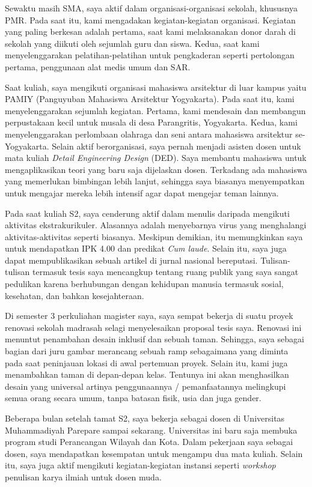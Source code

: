 \documentclass[../main.tex]{subfiles}
\begin{document}
Sewaktu masih SMA, saya aktif dalam organisasi-organisasi sekolah, khususnya PMR. Pada saat itu, kami mengadakan kegiatan-kegiatan organisasi. Kegiatan yang paling berkesan adalah pertama, saat kami melaksanakan donor darah di sekolah yang diikuti oleh sejumlah guru dan siswa. Kedua, saat kami menyelenggarakan pelatihan-pelatihan untuk pengkaderan seperti pertolongan pertama, penggunaan alat medis umum dan SAR.

Saat kuliah, saya mengikuti organisasi mahasiswa arsitektur di luar kampus yaitu PAMIY (Panguyuban Mahasiswa Arsitektur Yogyakarta). Pada saat itu, kami menyelenggarakan sejumlah kegiatan. Pertama, kami mendesain dan membangun perpustakaan kecil untuk musala di desa Parangritis, Yogyakarta. Kedua, kami menyelenggarakan perlombaan olahraga dan seni antara mahasiswa arsitektur se-Yogyakarta. Selain aktif berorganisasi, saya pernah menjadi asisten dosen untuk mata kuliah \textit{Detail Engineering Design} (DED). Saya membantu mahasiswa untuk mengaplikasikan teori yang baru saja dijelaskan dosen. Terkadang ada mahasiswa yang memerlukan bimbingan lebih lanjut, sehingga saya biasanya menyempatkan untuk mengajar mereka lebih intensif agar dapat mengejar teman lainnya.

Pada saat kuliah S2, saya cenderung aktif dalam menulis daripada mengikuti aktivitas ekstrakurikuler. Alasannya adalah menyebarnya virus yang menghalangi aktivitas-aktivitas seperti biasanya. Meskipun demikian, itu memungkinkan saya untuk mendapatkan IPK 4.00 dan predikat \textit{Cum laude}. Selain itu, saya juga dapat mempublikasikan sebuah artikel di jurnal nasional bereputasi. Tulisan-tulisan termasuk tesis saya mencangkup tentang ruang publik yang saya sangat pedulikan karena berhubungan dengan kehidupan manusia termasuk sosial, kesehatan, dan bahkan kesejahteraan.

Di semester 3 perkuliahan magister saya, saya sempat bekerja di suatu proyek renovasi sekolah madrasah selagi menyelesaikan proposal tesis saya.
Renovasi ini menuntut penambahan desain inklusif dan sebuah taman.
Sehingga, saya sebagai bagian dari juru gambar merancang sebuah ramp sebagaimana yang diminta pada saat peninjauan lokasi di awal pertemuan proyek. Selain itu, kami juga menambahkan taman di depan-depan kelas. Tentunya ini akan menghasilkan desain yang universal artinya penggunaannya / pemanfaatannya melingkupi semua orang secara umum, tanpa batasan fisik, usia dan juga gender.

Beberapa bulan setelah tamat S2, saya bekerja sebagai dosen di Universitas Muhammadiyah Parepare sampai sekarang.
Universitas ini baru saja membuka program studi Perancangan Wilayah dan Kota.
Dalam pekerjaan saya sebagai dosen, saya mendapatkan kesempatan untuk mengampu dua mata kuliah.
Selain itu, saya juga aktif mengikuti kegiatan-kegiatan instansi seperti \textit{workshop} penulisan karya ilmiah untuk dosen muda.
\end{document}
